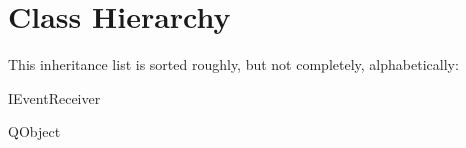 \section{Class Hierarchy}
This inheritance list is sorted roughly, but not completely, alphabetically\+:\begin{DoxyCompactList}
\item {}
\item I\+Event\+Receiver\begin{DoxyCompactList}
\item {}
\end{DoxyCompactList}
\item {}
\item Q\+Object\begin{DoxyCompactList}
\item {}
\end{DoxyCompactList}
\item {}
\end{DoxyCompactList}
